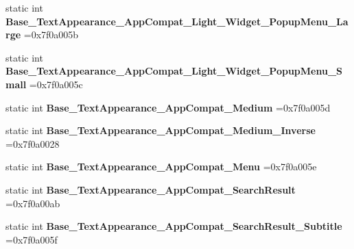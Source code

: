 \begin{DoxyCompactItemize}
static int {\bfseries Base\+\_\+\+Text\+Appearance\+\_\+\+App\+Compat\+\_\+\+Light\+\_\+\+Widget\+\_\+\+Popup\+Menu\+\_\+\+Large} =0x7f0a005b
\item 
\mbox{\label{classandroid_1_1support_1_1graphics_1_1drawable_1_1animated_1_1R_1_1style_a9ac184aabc6ad943fa56e691ab2bed3d}} 
static int {\bfseries Base\+\_\+\+Text\+Appearance\+\_\+\+App\+Compat\+\_\+\+Light\+\_\+\+Widget\+\_\+\+Popup\+Menu\+\_\+\+Small} =0x7f0a005c
\item 
\mbox{\label{classandroid_1_1support_1_1graphics_1_1drawable_1_1animated_1_1R_1_1style_ae34873c5e5696fbf5d867fc4fdfab61a}} 
static int {\bfseries Base\+\_\+\+Text\+Appearance\+\_\+\+App\+Compat\+\_\+\+Medium} =0x7f0a005d
\item 
\mbox{\label{classandroid_1_1support_1_1graphics_1_1drawable_1_1animated_1_1R_1_1style_af9ce6198bdaffc9cf093500e62f55435}} 
static int {\bfseries Base\+\_\+\+Text\+Appearance\+\_\+\+App\+Compat\+\_\+\+Medium\+\_\+\+Inverse} =0x7f0a0028
\item 
\mbox{\label{classandroid_1_1support_1_1graphics_1_1drawable_1_1animated_1_1R_1_1style_af410f40f6cbc3960734ea4fa29346d0e}} 
static int {\bfseries Base\+\_\+\+Text\+Appearance\+\_\+\+App\+Compat\+\_\+\+Menu} =0x7f0a005e
\item 
\mbox{\label{classandroid_1_1support_1_1graphics_1_1drawable_1_1animated_1_1R_1_1style_aa668cc720d680454328cf3b379fb38a6}} 
static int {\bfseries Base\+\_\+\+Text\+Appearance\+\_\+\+App\+Compat\+\_\+\+Search\+Result} =0x7f0a00ab
\item 
\mbox{\label{classandroid_1_1support_1_1graphics_1_1drawable_1_1animated_1_1R_1_1style_a353f8e13b5b2962c6883f5784a8a4d82}} 
static int {\bfseries Base\+\_\+\+Text\+Appearance\+\_\+\+App\+Compat\+\_\+\+Search\+Result\+\_\+\+Subtitle} =0x7f0a005f
\item 

\end{DoxyCompactItemize}
